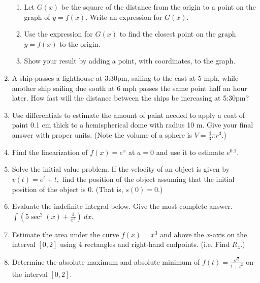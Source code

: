 \documentclass[12pt]{article}
\begin{document}
\begin{enumerate}
\begin{enumerate}
\item  Let $G(x)$ be the square of the distance from the origin to a point on the graph of $y=f(x)$.  Write an expression for $G(x)$.

\item Use the expression for $G(x)$ to find the closest point on the graph $y=f(x)$ to the origin.

\item  Show your result by adding a point, with coordinates, to the graph.
\end{enumerate}

\item A ship passes a lighthouse at 3:30pm, sailing to the east at 5 mph, while another ship sailing due south at 6 mph passes the same point half an hour later.  How fast will the distance between the ships be increasing at 5:30pm?
\item Use differentials to estimate the amount of paint needed to apply a coat of paint 0.1 cm thick to a hemispherical dome with radius 10 m. Give your final answer with proper units. (Note the volume of a sphere is $V=\frac{4}{3} \pi r^3.$)
\item Find the linearization of $f(x)=e^x$ at $a=0$ and use it to estimate $e^{0.1}.$
\item Solve the initial value problem. If the velocity of an object is given by $v(t)=e^{t} +t,$ find the position of the object assuming that the initial position of the object is $0.$ (That is, $s(0)=0.$)
\item Evaluate the indefinite integral below. Give the most complete answer.
$\int (5\sec^2(x) + \frac{1}{x^5}) \: dx$.
\item Estimate the area under the curve $f(x)=x^3$ and above the $x$-axis on the interval $[0,2]$ using 4 rectangles and right-hand endpoints. (i.e. Find $R_4.$)
\item Determine the absolute maximum and absolute minimum of $f(t)=\frac{\sqrt{t}}{1+t^2}$ on the interval $[0,2].$
\end{enumerate}
\end{document}
